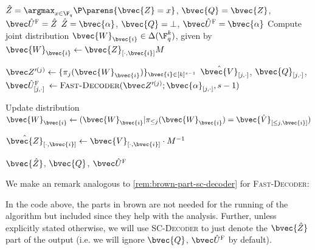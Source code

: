 \documentclass[11pt]{article}
\begin{document}
\begin{algorithm}[H]
	\caption{Fast Decoder}
	\label{algo:fast-decoder}
	\begin{algorithmic}[1]
		\If{$\bvec{\alpha} = \bot$}
		\State \Return $\hat Z = \argmax_{x \in \F_q} \P\parens{\bvec{Z} = x}$, {\color{brown} $\bvec{Q} = \bvec{Z}$, $\UF = \hat{Z}$}\label{line:base-case}
		\Else
		\State \Return $\hat Z = \bvec{\alpha}$, {\color{brown} $\bvec{Q} = \bot$, $\UF = \bvec{\alpha}$}
		\EndIf
		\Else
		\State Compute joint distribution $\bvec{W}_{\bvec{i}} \in \Delta(\F_q^k)$,
		given by $\bvec{W}_{\bvec{i}} \leftarrow \bvec{Z}_{[\cdot, \bvec{i}]} M$ \label{line:update-W_i}
		\EndFor
		
		\State $\Zpj \leftarrow \{\pi_j(\bvec{W}_\bvec{i})\}_{\bvec{i} \in [k]^{s-1}}$ \label{line:z}
		\State $\hat{\bvec{V}}_{[j,\cdot]}$, {\color{brown} $\bvec{Q}_{[j,\cdot]}$, $\UF_{[j,\cdot]}$} $\leftarrow \textsc{Fast-Decoder}(\Zpj; \bvec{\alpha}_{[j, \cdot]}, s-1)$ \label{line:v}
		
		\State Update distribution
		$\bvec{W}_{\bvec{i}} \leftarrow (\bvec{W}_{\bvec{i}} | \pi_{\leq j}(\bvec{W}_{\bvec{i}})= \bvec{\hat{V}}_{[\leq j,\bvec{i}]})$ 
		\label{line:updateW}
		\EndFor
		
		\EndFor
		
		\State $\hat{\bvec{Z}}_{[\cdot, \bvec{i}]} \leftarrow \bvec{V}_{[\cdot,\bvec{i}]}\cdot M^{-1}$ \label{line:setZ}
		\EndFor
		
		\State \Return $\bvec{\hat Z}$, {\color{brown} $\bvec{Q}$, $\UF$}\label{line:ret-fast-dec}
		
		\EndIf
		\EndProcedure
	\end{algorithmic}
\end{algorithm}

We make an remark analogous to \cref{rem:brown-part-sc-decoder} for \textsc{Fast-Decoder}:
\begin{remark}
\label{rem:brown-part-fast-decoder}
    In the code above, the parts in {\color{brown} brown} are not needed for the running of the algorithm but included since they help with the analysis. Further, unless explicitly stated otherwise, we will use \textsc{SC-Decoder} to just denote the $\bvec{\hat Z}$ part of the output (i.e. we will ignore {\color{brown} $\bvec{Q}$, $\UF$} by default).
\end{remark}
\end{document}
